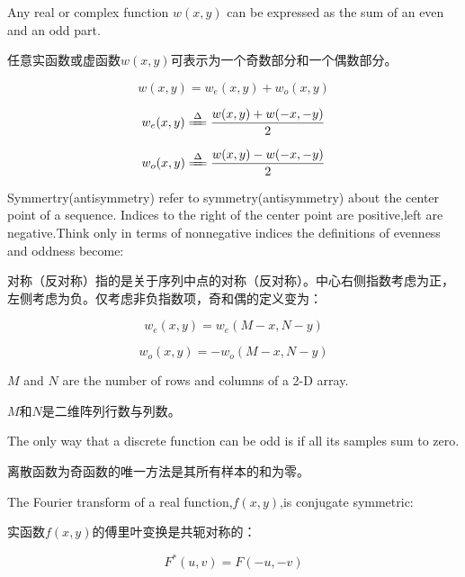 \documentclass[12pt]{article}
\numberwithin{equation}{section}%
\begin{document}
Any real or complex function $w(x,y)$ can be expressed as the sum of an even and an odd part. 

任意实函数或虚函数$w(x,y)$可表示为一个奇数部分和一个偶数部分。

\begin{equation} \label{4.32}
w(x,y)=w_{e}(x,y)+w_{o}(x,y)
\end{equation}

\begin{equation} \label{4.33}
w_{e}(x,y)\xlongequal{\Delta}\frac{w(x,y)+w(-x,-y)}{2} 
\end{equation}

\begin{equation} \label{4.34}
w_{o}(x,y)\xlongequal{\Delta}\frac{w(x,y)-w(-x,-y)}{2}
\end{equation}

Symmertry(antisymmetry) refer to symmetry(antisymmetry) about the center point of a sequence.  Indices to the right of the center point are positive,left are negative.Think only in terms of nonnegative indices the definitions of evenness and oddness become:

对称（反对称）指的是关于序列中点的对称（反对称）。中心右侧指数考虑为正，左侧考虑为负。仅考虑非负指数项，奇和偶的定义变为：

\begin{equation} \label{4.35}
w_{e}(x,y)=w_{e}(M-x,N-y)
\end{equation}

\begin{equation} \label{4.36}
w_{o}(x,y)=-w_{o}(M-x,N-y)
\end{equation}

$M$ and $N$ are the number of rows and columns of a 2-D array.

$M$和$N$是二维阵列行数与列数。

The only way that a discrete function can be odd is if all its samples sum to zero.

离散函数为奇函数的唯一方法是其所有样本的和为零。

The Fourier transform of a real function,$f(x,y)$,is conjugate symmetric:

实函数$f(x,y)$的傅里叶变换是共轭对称的：

\begin{equation} \label{4.37}
F^{*}(u,v)=F(-u,-v)
\end{equation}
\end{document}
